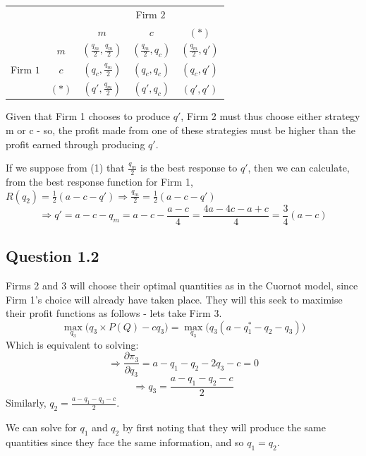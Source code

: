 \documentclass[11pt,a4paper]{article}
\begin{document}
\begin{table}[h]
\setlength{\extrarowheight}{2pt}
\begin{center}
\begin{tabular}{cc|c|c|c|}
  & \multicolumn{1}{c}{} & \multicolumn{3}{c}{Firm $2$} \\
  & \multicolumn{1}{c}{} & \multicolumn{1}{c}{$m$}  & \multicolumn{1}{c}{$c$}  & \multicolumn{1}{c}{$(*)$} \\\cline{3-5}
            & $m$ & $(\frac{q_m}{2},\frac{q_m}{2})$ & $(\frac{q_m}{2},q_c)$ & $(\frac{q_m}{2},q')$ \\ \cline{3-5}
Firm $1$    & $c$ & $(q_c,\frac{q_m}{2})$ & $(q_c,q_c)$ & $(q_c,q')$ \\\cline{3-5}
            & $(*)$ & $(q',\frac{q_m}{2})$ & $(q',q_c)$ & $(q',q')$ \\\cline{3-5}
\end{tabular}
\end{center}
\end{table}

Given that Firm 1 chooses to produce $q'$, Firm 2 must thus choose either strategy m or c - so, the profit made from one of these strategies must be higher than the profit earned through producing $q'$. 

If we suppose from (1) that $\frac{q_m}{2}$ is the best response to $q'$, then we can calculate, from the best response function for Firm 1, $R(q_2) = \frac{1}{2}(a-c-q') \Rightarrow \frac{q_m}{2} = \frac{1}{2}(a-c-q') $
$$\Rightarrow q' = a-c-q_m = a-c-\frac{a-c}{4} = \frac{4a-4c-a+c}{4} = \frac{3}{4}(a-c)$$

\subsection*{Question 1.2}

Firms 2 and 3 will choose their optimal quantities as in the Cuornot model, since Firm 1's choice will already have taken place. They will this seek to maximise their profit functions as follows - lets take Firm 3.
$$ \max_{q_3} \Big( q_3 \times P(Q) - cq_3 \Big) = \max_{q_3}\Big( q_3(a-q_1^*-q_2-q_3)\Big)$$
Which is equivalent to solving:
$$ \Rightarrow \frac{\partial \pi_3}{\partial q_3} = a-q_1-q_2-2q_3-c = 0$$
$$ \Rightarrow q_3 = \frac{a-q_1-q_2-c}{2}$$
Similarly, $q_2 = \frac{a-q_1-q_3-c}{2}$.

We can solve for $q_1$ and $q_2$ by first noting that they will produce the same quantities since they face the same information, and so $q_1 = q_2$.
\end{document}
